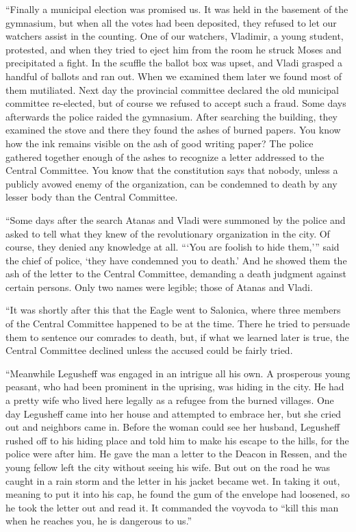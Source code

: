 \documentclass[a5paper,12pt]{book}
\begin{document}
“Finally a municipal election was promised us. It was held in the basement of the gymnasium, but when all the votes had been deposited, they refused to let our watchers assist in the counting. One of our watchers, Vladimir, a young student, protested, and when they tried to eject him from the room he struck Moses and precipitated a fight. In the scuffle the ballot box was upset, and Vladi grasped a handful of ballots and ran out. When we examined them later we found most of them mutiliated. Next day the provincial committee declared the old municipal committee re-elected, but of course we refused to accept such a fraud.
Some days afterwards the police raided the gymnasium. After searching the building, they examined the stove and there they found the ashes of burned papers. You know how the ink remains visible on the ash of good writing paper? The police gathered together enough of the ashes to recognize a letter addressed to the Central Committee. You know that the constitution says that nobody, unless a publicly avowed enemy of the organization, can be condemned to death by any lesser body than the Central Committee.

“Some days after the search Atanas and Vladi were summoned by the police and asked to tell what they knew of the revolutionary organization in the city. Of course, they denied any knowledge at all. “‘You are foolish to hide them,’” said the chief of police, ‘they have condemned you to death.’ And he showed them the ash of the letter to the Central Committee, demanding a death judgment against certain persons. Only two names were legible; those of Atanas and Vladi.

“It was shortly after this that the Eagle went to Salonica, where three members of the Central Committee happened to be at the time. There he tried to persuade them to sentence our comrades to death, but, if what we learned later is true, the Central Committee declined unless the accused could be fairly tried.

“Meanwhile Legusheff was engaged in an intrigue all his own. A prosperous young peasant, who had been prominent in the uprising, was hiding in the city. He had a pretty wife who lived here legally as a refugee from the burned villages. One day Legusheff came into her house and attempted to embrace her, but she cried out and neighbors came in. Before the woman could see her husband, Legusheff rushed off to his hiding place and told him to make his escape to the hills, for the police were after him. He gave the man a letter to the Deacon in Ressen, and the young fellow left the city without seeing his wife. But out on the road he was caught in a rain storm and the letter in his jacket became wet. In taking it out, meaning to put it into his cap, he found the gum of the envelope had loosened, so he took the letter out and read it. It commanded the voyvoda to “kill this man when he reaches you, he is dangerous to us.”
\end{document}
